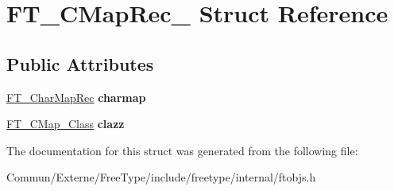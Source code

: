 \hypertarget{struct_f_t___c_map_rec__}{}\section{F\+T\+\_\+\+C\+Map\+Rec\+\_\+ Struct Reference}
\label{struct_f_t___c_map_rec__}
\subsection*{Public Attributes}
\begin{DoxyCompactItemize}
\item 
\hyperlink{struct_f_t___char_map_rec__}{F\+T\+\_\+\+Char\+Map\+Rec} {\bfseries charmap}\hypertarget{struct_f_t___c_map_rec___a39fa6de9995d4ae4496b93e2b874b34e}{}\label{struct_f_t___c_map_rec___a39fa6de9995d4ae4496b93e2b874b34e}

\item 
\hyperlink{struct_f_t___c_map___class_rec__}{F\+T\+\_\+\+C\+Map\+\_\+\+Class} {\bfseries clazz}\hypertarget{struct_f_t___c_map_rec___aa85db42650df0edb38f8af5887c0ac6a}{}\label{struct_f_t___c_map_rec___aa85db42650df0edb38f8af5887c0ac6a}

\end{DoxyCompactItemize}


The documentation for this struct was generated from the following file\+:\begin{DoxyCompactItemize}
\item 
Commun/\+Externe/\+Free\+Type/include/freetype/internal/ftobjs.\+h\end{DoxyCompactItemize}
